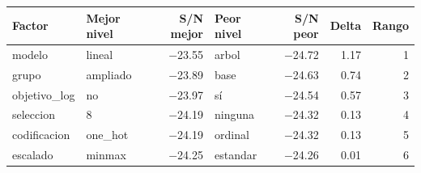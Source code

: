 \begin{tabular}{llrlrrr}
\toprule
Factor & Mejor nivel & S/N mejor & Peor nivel & S/N peor & Delta & Rango \\
\midrule
modelo & lineal & $-$23.55 & arbol & $-$24.72 & 1.17 & 1 \\
grupo & ampliado & $-$23.89 & base & $-$24.63 & 0.74 & 2 \\
objetivo\_log & no & $-$23.97 & sí & $-$24.54 & 0.57 & 3 \\
seleccion & 8 & $-$24.19 & ninguna & $-$24.32 & 0.13 & 4 \\
codificacion & one\_hot & $-$24.19 & ordinal & $-$24.32 & 0.13 & 5 \\
escalado & minmax & $-$24.25 & estandar & $-$24.26 & 0.01 & 6 \\
\bottomrule
\end{tabular}

